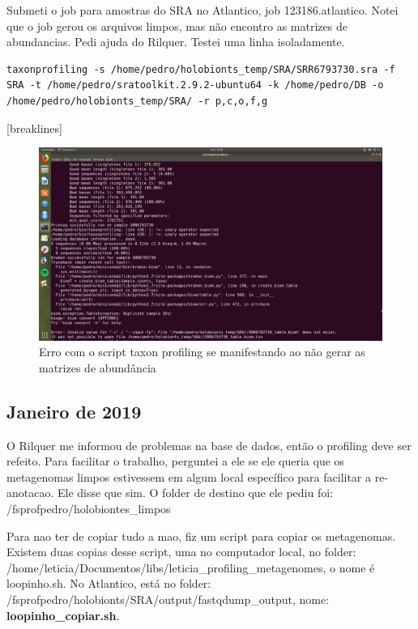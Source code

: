 \documentclass[12pt, a4paper]{report}
\begin{document}
Submeti o job para amostras do SRA no Atlantico, job 123186.atlantico.  Notei que o job gerou os arquivos limpos, mas não encontro as matrizes de abundancias. Pedi ajuda do Rilquer. Testei uma linha isoladamente. 

\begin{lstlisting}[breaklines]
taxonprofiling -s /home/pedro/holobionts_temp/SRA/SRR6793730.sra -f SRA -t /home/pedro/sratoolkit.2.9.2-ubuntu64 -k /home/pedro/DB -o /home/pedro/holobionts_temp/SRA/ -r p,c,o,f,g
\end{lstlisting}[breaklines]

\begin{figure}[H]
\centering
\includegraphics[scale=0.3]{figures/erro_26_10.png}
\caption{Erro com o script taxon profiling se manifestando ao não gerar as matrizes de abundância}
\end{figure}

\subsection{Janeiro de 2019}
O Rilquer me informou de problemas na base de dados, então o profiling deve ser refeito. Para facilitar o trabalho, perguntei a ele se ele queria que os metagenomas limpos estivessem em algum local específico para facilitar a re-anotacao. Ele disse que sim. O folder de destino que ele pediu foi: /fsprofpedro/holobiontes\_limpos

Para nao ter de copiar tudo a mao, fiz um script para copiar os metagenomas. Existem duas copias desse script, uma no computador local, no folder: /home/leticia/Documentos/libs/leticia\_profiling\_metagenomes, o nome é loopinho.sh. No Atlantico, está no folder: /fsprofpedro/holobionts/SRA/output/fastqdump\_output, nome: \textbf{loopinho\_copiar.sh}. 
\end{document}
